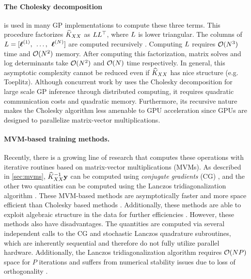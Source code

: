 \paragraph{The Cholesky decomposition} is used in many GP implementations to compute these three terms.
This procedure factorizes $\widehat{K}_{XX}$ as $L L^\top$, where $L$ is lower triangular.
The columns of $L = [ \boldsymbol{\ell}^{(1)}, \:\: \ldots, \:\: \boldsymbol{\ell}^{(N)} ]$ are computed recursively \citep{golub2012matrix}.
Computing $L$ requires $\bigo{N^3}$ time and $\bigo{N^2}$ memory.
After computing this factorization, matrix solves and log determinants take $\bigo{N^2}$ and $\bigo{N}$ time respectively.
In general, this asymptotic complexity cannot be reduced even if $\widehat{K}_{XX}$ has nice structure (e.g. Toeplitz).
Although concurrent work by \citet{nguyen2019exact} uses the Cholesky decomposition for large scale GP inference through distributed computing, it requires quadratic communication costs and quadratic memory.
Furthermore, its recursive nature makes the Cholesky algorithm less amenable to GPU acceleration since GPUs are designed to parallelize matrix-vector multiplications.

\paragraph{MVM-based training methods.}
Recently, there is a growing line of research that computes these operations with iterative routines based on matrix-vector multiplications (MVMs).
As described in \cref{sec:mvms},
$\widehat{K}_{XX}^{-1}\mathbf{y}$ can be computed using \emph{conjugate gradients} (CG) \cite{cunningham2008fast,cutajar2016preconditioning},
and the other two quantities can be computed using the Lanczos tridiagonalization algorithm \cite{ubaru2017fast,dong2017scalable}.
These MVM-based methods are asymptotically faster and more space efficient than Cholesky based methods \cite{wilson2015kernel,dong2017scalable}.
Additionally, these methods are able to exploit algebraic structure in the data for further efficiencies \cite{cunningham2008fast,saatcci2012scalable,wilson2015kernel}.
However, these methods also have disadvantages.
The quantities are computed via several independent calls to the CG and stochastic Lanczos quadrature subroutines, which are inherently sequential and therefore do not fully utilize parallel hardware.
Additionally, the Lanczos tridiagonalization algorithm requires $\bigo{NP}$ space for $P$ iterations and suffers from numerical stability issues due to loss of orthogonality \cite{golub2012matrix}.

